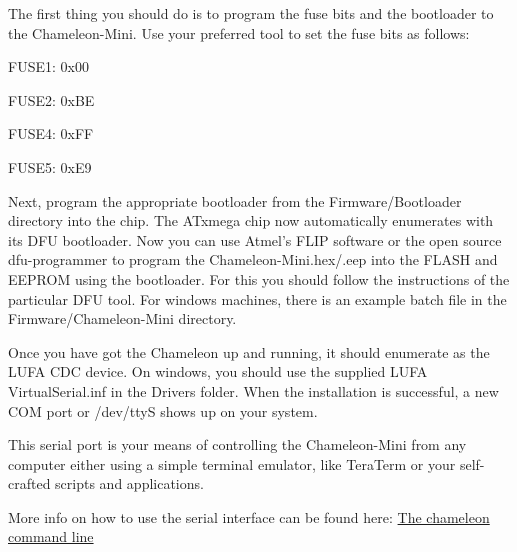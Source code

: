 The first thing you should do is to program the fuse bits and the bootloader to the Chameleon-\/\-Mini. Use your preferred tool to set the fuse bits as follows\-:
\begin{DoxyItemize}
\item F\-U\-S\-E1\-: 0x00
\item F\-U\-S\-E2\-: 0x\-B\-E
\item F\-U\-S\-E4\-: 0x\-F\-F
\item F\-U\-S\-E5\-: 0x\-E9
\end{DoxyItemize}

Next, program the appropriate bootloader from the Firmware/\-Bootloader directory into the chip. The A\-Txmega chip now automatically enumerates with its D\-F\-U bootloader. Now you can use Atmel's F\-L\-I\-P software or the open source dfu-\/programmer to program the Chameleon-\/\-Mini.\-hex/.eep into the F\-L\-A\-S\-H and E\-E\-P\-R\-O\-M using the bootloader. For this you should follow the instructions of the particular D\-F\-U tool. For windows machines, there is an example batch file in the Firmware/\-Chameleon-\/\-Mini directory.

Once you have got the Chameleon up and running, it should enumerate as the L\-U\-F\-A C\-D\-C device. On windows, you should use the supplied L\-U\-F\-A Virtual\-Serial.\-inf in the Drivers folder. When the installation is successful, a new C\-O\-M port or /dev/tty\-S shows up on your system.

This serial port is your means of controlling the Chameleon-\/\-Mini from any computer either using a simple terminal emulator, like Tera\-Term or your self-\/crafted scripts and applications.

More info on how to use the serial interface can be found here\-: \hyperlink{Page_CommandLine}{The chameleon command line} 